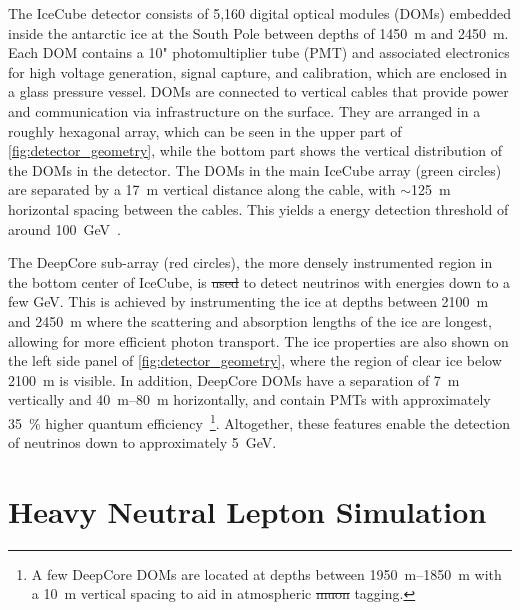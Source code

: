 \documentclass[
    aps,
    prd,
    reprint,
    amsmath,
    amssymb,
    nofootinbib,
    linenumbers,
    superscriptaddress,
    floatfix
]{revtex4-2}
\newcommand{\gev}{\giga\electronvolt}
\providecommand{\DIFaddtex}[1]{{\protect\color{blue}\uwave{#1}}} %
\providecommand{\DIFdeltex}[1]{{\protect\color{red}\sout{#1}}}                      %
\providecommand{\DIFaddbegin}{} %
\providecommand{\DIFaddend}{} %
\providecommand{\DIFdelbegin}{} %
\providecommand{\DIFdelend}{} %
\providecommand{\DIFadd}[1]{\texorpdfstring{\DIFaddtex{#1}}{#1}} %
\providecommand{\DIFdel}[1]{\texorpdfstring{\DIFdeltex{#1}}{}} %
\newcommand{\DIFscaledelfig}{0.5}
\newlength{\DIFdelgraphicswidth} %
\newlength{\DIFdelgraphicsheight} %
\newcommand{\DIFaddincludegraphics}[2][]{{\color{blue}\fbox{\DIFOincludegraphics[#1]{#2}}}} %
\newcommand{\DIFdelincludegraphics}[2][]{%
\sbox{\DIFdelgraphicsbox}{\DIFOincludegraphics[#1]{#2}}%
\settoboxwidth{\DIFdelgraphicswidth}{\DIFdelgraphicsbox} %
\settoboxtotalheight{\DIFdelgraphicsheight}{\DIFdelgraphicsbox} %
\scalebox{\DIFscaledelfig}{%
\parbox[b]{\DIFdelgraphicswidth}{\usebox{\DIFdelgraphicsbox}\\[-\baselineskip] \rule{\DIFdelgraphicswidth}{0em}}\llap{\resizebox{\DIFdelgraphicswidth}{\DIFdelgraphicsheight}{%
\setlength{\unitlength}{\DIFdelgraphicswidth}%
\begin{picture}(1,1)%
\thicklines\linethickness{2pt} %
{\color[rgb]{1,0,0}\put(0,0){\framebox(1,1){}}}%
{\color[rgb]{1,0,0}\put(0,0){\line( 1,1){1}}}%
{\color[rgb]{1,0,0}\put(0,1){\line(1,-1){1}}}%
\end{picture}%
}\hspace*{3pt}}} %
} %
\DeclareRobustCommand{\DIFaddbegin}{\DIFOaddbegin \let\includegraphics\DIFaddincludegraphics} %
\DeclareRobustCommand{\DIFaddend}{\DIFOaddend \let\includegraphics\DIFOincludegraphics} %
\DeclareRobustCommand{\DIFdelbegin}{\DIFOdelbegin \let\includegraphics\DIFdelincludegraphics} %
\DeclareRobustCommand{\DIFdelend}{\DIFOaddend \let\includegraphics\DIFOincludegraphics} %
\begin{document}
The IceCube detector consists of 5,160 digital optical modules (DOMs) embedded inside the antarctic ice at the South Pole between depths of \SI{1450}{\m} and \SI{2450}{\m}. Each DOM contains a 10" photomultiplier tube (PMT) and associated electronics for high voltage generation, signal capture, and calibration, which are enclosed in a glass pressure vessel. DOMs are connected to vertical cables that provide power and communication via infrastructure on the surface. They are arranged in a roughly hexagonal array, which can be seen in the upper part of \cref{fig:detector_geometry}, while the bottom part shows the vertical distribution of the DOMs in the detector. The DOMs in the main IceCube array (green circles) are separated by a \SI{17}{\m} vertical distance along the cable, with $\sim$\SI{125}{\m} horizontal spacing between the cables. This yields a energy detection threshold of around \SI{100}{\gev}~\cite{IceCube:2016zyt}.

The DeepCore sub-array (red circles), the more densely instrumented region in the bottom center of IceCube, is \DIFdelbegin \DIFdel{used }\DIFdelend \DIFaddbegin \DIFadd{optimized }\DIFaddend to detect neutrinos with energies down to a few GeV. This is achieved by instrumenting the ice at depths between \SI{2100}{\m} and \SI{2450}{\m} where the scattering and absorption lengths of the ice are longest, allowing for more efficient photon transport\DIFaddbegin \DIFadd{~\mbox{%
\cite{ice_calibration}}\hspace{0pt}%
}\DIFaddend . The ice properties are also shown on the left side panel of \cref{fig:detector_geometry}, where the region of clear ice below \SI{2100}{\m} is visible. In addition, DeepCore DOMs have a separation of \SI{7}{\m} vertically and \SIrange{40}{80}{\m} horizontally, and contain PMTs with approximately \SI{35}{\percent} higher quantum efficiency~\cite{IceCube:2011ucd}\footnote{A few DeepCore DOMs are located at depths between \SIrange{1950}{1850}{\m} with a \SI{10}{\m} vertical spacing to aid in atmospheric \DIFdelbegin \DIFdel{muon }\DIFdelend \DIFaddbegin \DIFadd{$\mu$ }\DIFaddend tagging.}. Altogether, these features enable the detection of neutrinos down to approximately \SI{5}{\gev}.




\section{\label{sec:generator}Heavy Neutral Lepton Simulation}
\end{document}
